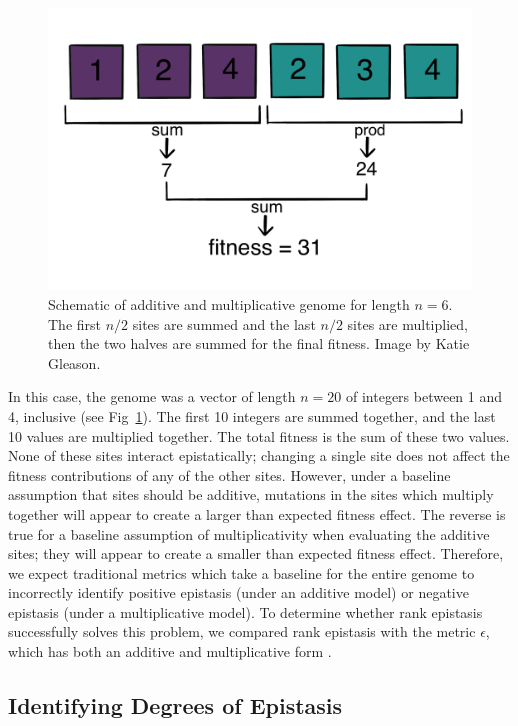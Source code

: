\begin{figure}
    \centering
    \includegraphics{chapters/1-rank-epistasis/figs/ADDMULT.PNG}
    \caption{Schematic of additive and multiplicative genome for length $n=6$. The first $n/2$ sites are summed and the last $n/2$ sites are multiplied, then the two halves are summed for the final fitness. Image by Katie Gleason.}
    \label{fig:method:admult}
\end{figure}

In this case, the genome was a vector of length $n=20$ of integers between 1 and 4, inclusive (see Fig~\ref{fig:method:admult}). The first 10 integers are summed together, and the last 10 values are multiplied together. The total fitness is the sum of these two values. None of these sites interact epistatically; changing a single site does not affect the fitness contributions of any of the other sites. However, under a baseline assumption that sites should be additive, mutations in the sites which multiply together will appear to create a larger than expected fitness effect. The reverse is true for a baseline assumption of multiplicativity when evaluating the additive sites; they will appear to create a smaller than expected fitness effect. Therefore, we expect traditional metrics which take a baseline for the entire genome to incorrectly identify positive epistasis (under an additive model) or negative epistasis (under a multiplicative model). To determine whether rank epistasis successfully solves this problem, we compared rank epistasis with the metric $\epsilon$, which has both an additive and multiplicative form \citep{ostman_impact_2011}. 

\subsection{Identifying Degrees of Epistasis}



